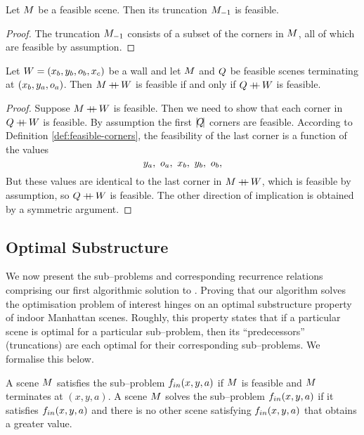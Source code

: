 \begin{lemma}
  \label{lemma:trunc-feasibility}
  Let $\Scene$ be a feasible scene. Then its truncation $\Scene_{-1}$ is
  feasible.
\end{lemma}
\begin{proof}
  The truncation $\Scene_{-1}$ consists of a subset of the corners in
  $\Scene$, all of which are feasible by assumption.
\end{proof}

\begin{lemma}
  \label{lemma:concat-feasibility}
  Let $\Wall=(x_b,y_b,\WallOrient_b,x_c)$ be a wall and let $\Scene$ and
  $\OtherScene$ be feasible scenes terminating at
  $(x_b,y_a,\WallOrient_a)$. Then $\Scene\concat\Wall$ is feasible if
  and only if $\OtherScene\concat\Wall$ is feasible.
\end{lemma}
\begin{proof}
  Suppose $\Scene\concat\Wall$ is feasible. Then we need to show that
  each corner in $\OtherScene\concat\Wall$ is feasible. By assumption
  the first $\Length{\OtherScene}$ corners are feasible. According to
  Definition \ref{def:feasible-corners}, the feasibility of the last corner
  is a function of the values
  \begin{equation}
    y_a,~\WallOrient_a,~x_b,~y_b,~\WallOrient_b,
  \end{equation}
  But these values are identical to the last corner in
  $\Scene\concat\Wall$, which is feasible by assumption, so
  $\OtherScene\concat\Wall$ is feasible. The other
  direction of implication is obtained by a symmetric argument.
\end{proof}

\subsection{Optimal Substructure}

We now present the sub--problems and corresponding recurrence
relations comprising our first algorithmic solution to
. Proving that our algorithm solves the optimisation
problem of interest hinges on an optimal substructure property of
indoor Manhattan scenes. Roughly, this property
states that if a particular scene is optimal for a particular
sub--problem, then its ``predecessors'' (truncations) are each optimal
for their corresponding sub--problems. We formalise this below.

\begin{definition}
  \label{def:sub-problem-in}
  A scene $\Scene$ satisfies the sub--problem $\SubProbIN(x,y,a)$ if
  $\Scene$ is feasible and $\Scene$ terminates at $(x,y,a)$.
  A scene $\Scene$ solves the sub--problem $\SubProbIN(x,y,a)$ if it
  satisfies $\SubProbIN(x,y,a)$ and there is no other scene satisfying
  $\SubProbIN(x,y,a)$ that obtains a greater value.
\end{definition}

